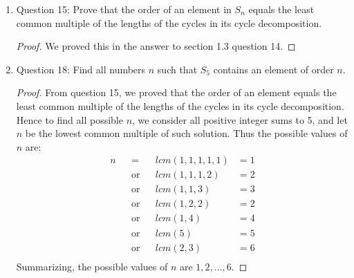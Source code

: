 \documentclass{article}
\begin{document}
\begin{enumerate}
\begin{enumerate}
\begin{proof}
          $\sigma = (1,2)(3,4,5)$ is an explicit example of an element
          in $S_n$ that does not have a prime order. This element has order
          $|(1,2)|\cdot |(3,4,5)| = 2\cdot 3 = 6$, which is not prime.
        \end{proof}
      \item Question 15: Prove that the order of an element in $S_n$ equals
        the least common multiple of the lengths of the cycles in its cycle
        decomposition.
        \begin{proof}
          We proved this in the answer to section 1.3 question 14. 
        \end{proof}
      \item Question 18: Find all numbers $n$ such that $S_5$ contains an
        element of order $n$.
        \begin{proof}
          From question 15, we proved that the order of an element equals
          the least common multiple of the lengths of the cycles in its
          cycle decomposition. Hence to find all possible $n$, we consider
          all positive integer sums to 5, and let $n$ be the lowest common
          multiple of such solution. Thus the possible values of $n$ are:
          \begin{align*}
            n && =         && lcm(1,1,1,1,1)  & = 1 \\
              && \text{or} && lcm(1,1,1,2)    & = 2 \\
              && \text{or} && lcm(1,1,3)      & = 3 \\
              && \text{or} && lcm(1,2,2)      & = 2 \\
              && \text{or} && lcm(1,4)        & = 4 \\
              && \text{or} && lcm(5)          & = 5 \\
              && \text{or} && lcm(2,3)        & = 6 \\
          \end{align*}
          Summarizing, the possible values of $n$ are $1,2,\ldots,6$.
        \end{proof}
    \end{enumerate}


\end{enumerate}
\end{document}
